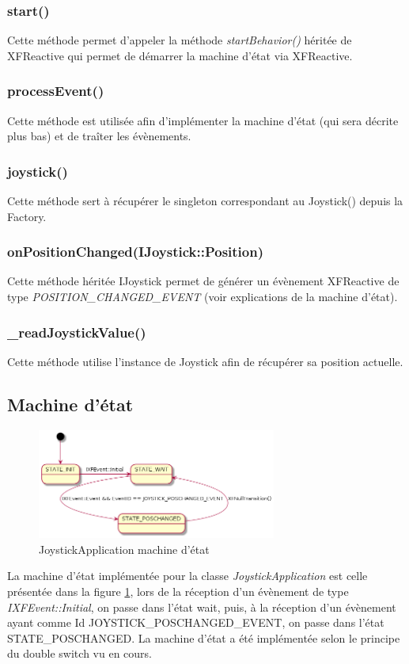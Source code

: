 \documentclass{report}
\begin{document}
\subsubsection{start()}
Cette méthode permet d'appeler la méthode \textit{startBehavior()} héritée de XFReactive qui permet de démarrer la machine d'état via XFReactive.
\subsubsection{processEvent()}
Cette méthode est utilisée afin d'implémenter la machine d'état (qui sera décrite plus bas) et de traîter les évènements.
\subsubsection{joystick()}
Cette méthode sert à récupérer le singleton correspondant au Joystick() depuis la Factory.
\subsubsection{onPositionChanged(IJoystick::Position)}
Cette méthode héritée IJoystick permet de générer un évènement XFReactive de type \textit{POSITION\_CHANGED\_EVENT} (voir explications de la machine d'état).
\subsubsection{\_readJoystickValue()}
Cette méthode utilise l'instance de Joystick afin de récupérer sa position actuelle.
\subsection{Machine d'état}
\begin{figure}[H]
    \centering
    \includegraphics[width= 0.7\textwidth]{Images/SMDiagram.png}
    \caption{JoystickApplication machine d'état}
    \label{fig:SMJoystickApp}
\end{figure}
La machine d'état implémentée pour la classe \textit{JoystickApplication} est celle présentée dans la figure \ref{fig:SMJoystickApp}, lors de la réception d'un évènement de type \textit{IXFEvent::Initial}, on passe dans l'état wait, puis, à la réception d'un évènement ayant comme Id JOYSTICK\_POSCHANGED\_EVENT, on passe dans l'état STATE\_POSCHANGED. La machine d'état a été implémentée selon le principe du double switch vu en cours.
\end{document}
